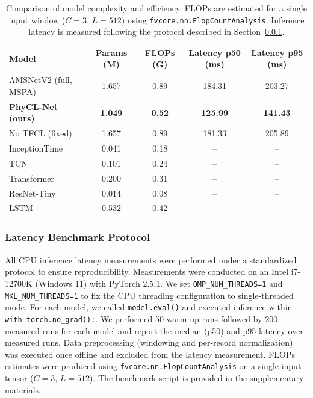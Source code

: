 \documentclass{article}
\begin{document}
\begin{table}[htbp]
\caption{Comparison of model complexity and efficiency. FLOPs are estimated for a single input window ($C=3$, $L=512$) using \texttt{fvcore.nn.FlopCountAnalysis}. Inference latency is measured following the protocol described in Section~\ref{sec:latency_protocol}.}
\label{tab:complexity}
\centering
\begin{tabular}{lcccc}
\toprule
Model & Params (M) & FLOPs (G) & Latency p50 (ms) & Latency p95 (ms) \\
\midrule
AMSNetV2 (full, MSPA) & 1.657 & 0.89 & 184.31 & 203.27 \\
\textbf{PhyCL-Net (ours)} & \textbf{1.049} & \textbf{0.52} & \textbf{125.99} & \textbf{141.43} \\
No TFCL (fixed) & 1.657 & 0.89 & 181.33 & 205.89 \\
\midrule
InceptionTime & 0.041 & 0.18 & -- & -- \\
TCN & 0.101 & 0.24 & -- & -- \\
Transformer & 0.200 & 0.31 & -- & -- \\
ResNet-Tiny & 0.014 & 0.08 & -- & -- \\
LSTM & 0.532 & 0.42 & -- & -- \\
\bottomrule
\end{tabular}
\end{table}

\subsubsection{Latency Benchmark Protocol}
\label{sec:latency_protocol}

All CPU inference latency measurements were performed under a standardized protocol to ensure reproducibility. Measurements were conducted on an Intel i7-12700K (Windows 11) with PyTorch 2.5.1. We set \texttt{OMP\_NUM\_THREADS=1} and \texttt{MKL\_NUM\_THREADS=1} to fix the CPU threading configuration to single-threaded mode. For each model, we called \texttt{model.eval()} and executed inference within \texttt{with torch.no\_grad():}. We performed 50 warm-up runs followed by 200 measured runs for each model and report the median (p50) and p95 latency over measured runs. Data preprocessing (windowing and per-record normalization) was executed once offline and excluded from the latency measurement. FLOPs estimates were produced using \texttt{fvcore.nn.FlopCountAnalysis} on a single input tensor ($C=3$, $L=512$). The benchmark script is provided in the supplementary materials.
\end{document}
